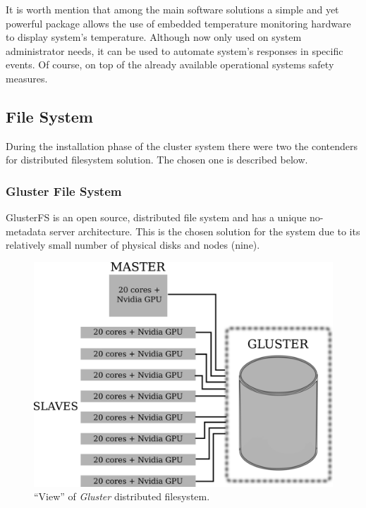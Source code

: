 \documentclass[twoside,a4paper,12pt,english]{inac19}
\begin{document}
It is worth mention that among the main software solutions a simple and yet powerful package 
allows the use of embedded temperature monitoring hardware to display system's temperature. 
Although now only used on system administrator needs, it can be used to automate system's 
responses in specific events. Of course, on top of the already available operational systems 
safety measures. 

\subsection{File System}

During the installation phase of the cluster system\cite{cluster17} there were two the contenders for
distributed filesystem solution. The chosen one is described below.

\subsubsection{Gluster File System}

GlusterFS\cite{gluster} is an open source, distributed file system and has
a unique no-metadata server architecture. This is the chosen solution for the system due to its relatively
small number of physical disks and nodes (nine).

\begin{figure}[ht] %
  \centering\includegraphics[scale=0.7]{images/cluster-gluster.png}
  \caption{``View'' of \textit{Gluster} distributed filesystem.}
  \label{fig:cluster-gluster}
\end{figure}
\end{document}
